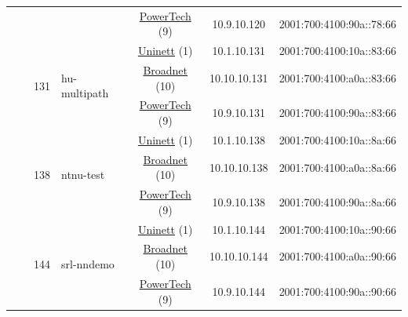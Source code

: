\begin{small}
\begin{center}
\begin{longtable}{|c|c|c|c|c|c|c|c|}
  &  &  &  & \multicolumn{2}{|c|}{\tiny{\href{http://www.powertech.no}{PowerTech} (9)}} & \tiny{10.9.10.120} & \tiny{2001:700:4100:90a::78:66} \\* \cline{3-3}\cline{4-4}\cline{5-5}\cline{6-6}\cline{7-7}\cline{8-8}
  &  & \multirow{3}{*}{\tiny{131}} & \multicolumn{1}{|l|}{\multirow{3}{*}{\tiny{hu-multipath}}} & \multicolumn{2}{|c|}{\tiny{\href{https://www.uninett.no}{Uninett} (1)}} & \tiny{10.1.10.131} & \tiny{2001:700:4100:10a::83:66} \\* \cline{5-5}\cline{6-6}\cline{7-7}\cline{8-8}
  &  &  &  & \multicolumn{2}{|c|}{\tiny{\href{https://www.broadnet.no}{Broadnet} (10)}} & \tiny{10.10.10.131} & \tiny{2001:700:4100:a0a::83:66} \\* \cline{5-5}\cline{6-6}\cline{7-7}\cline{8-8}
  &  &  &  & \multicolumn{2}{|c|}{\tiny{\href{http://www.powertech.no}{PowerTech} (9)}} & \tiny{10.9.10.131} & \tiny{2001:700:4100:90a::83:66} \\* \cline{3-3}\cline{4-4}\cline{5-5}\cline{6-6}\cline{7-7}\cline{8-8}
  &  & \multirow{3}{*}{\tiny{138}} & \multicolumn{1}{|l|}{\multirow{3}{*}{\tiny{ntnu-test}}} & \multicolumn{2}{|c|}{\tiny{\href{https://www.uninett.no}{Uninett} (1)}} & \tiny{10.1.10.138} & \tiny{2001:700:4100:10a::8a:66} \\* \cline{5-5}\cline{6-6}\cline{7-7}\cline{8-8}
  &  &  &  & \multicolumn{2}{|c|}{\tiny{\href{https://www.broadnet.no}{Broadnet} (10)}} & \tiny{10.10.10.138} & \tiny{2001:700:4100:a0a::8a:66} \\* \cline{5-5}\cline{6-6}\cline{7-7}\cline{8-8}
  &  &  &  & \multicolumn{2}{|c|}{\tiny{\href{http://www.powertech.no}{PowerTech} (9)}} & \tiny{10.9.10.138} & \tiny{2001:700:4100:90a::8a:66} \\* \cline{3-3}\cline{4-4}\cline{5-5}\cline{6-6}\cline{7-7}\cline{8-8}
  &  & \multirow{3}{*}{\tiny{144}} & \multicolumn{1}{|l|}{\multirow{3}{*}{\tiny{srl-nndemo}}} & \multicolumn{2}{|c|}{\tiny{\href{https://www.uninett.no}{Uninett} (1)}} & \tiny{10.1.10.144} & \tiny{2001:700:4100:10a::90:66} \\* \cline{5-5}\cline{6-6}\cline{7-7}\cline{8-8}
  &  &  &  & \multicolumn{2}{|c|}{\tiny{\href{https://www.broadnet.no}{Broadnet} (10)}} & \tiny{10.10.10.144} & \tiny{2001:700:4100:a0a::90:66} \\* \cline{5-5}\cline{6-6}\cline{7-7}\cline{8-8}
  &  &  &  & \multicolumn{2}{|c|}{\tiny{\href{http://www.powertech.no}{PowerTech} (9)}} & \tiny{10.9.10.144} & \tiny{2001:700:4100:90a::90:66} \\* \cline{3-3}\cline{4-4}\cline{5-5}\cline{6-6}\cline{7-7}\cline{8-8}

\end{longtable}
\end{center}
\end{small}
